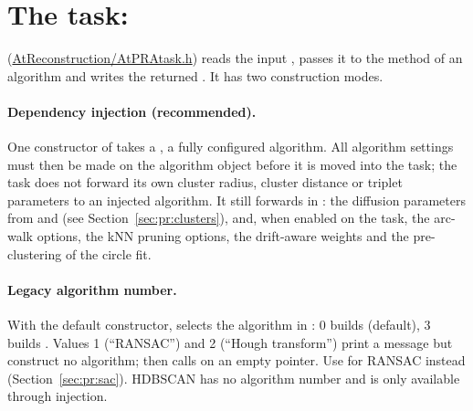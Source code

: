 \section{The task: }
\label{sec:pr:task}

 (\url{AtReconstruction/AtPRAtask.h}) reads the input , passes it to the
 method of an  algorithm and writes the returned . It has two
construction modes.

\paragraph{Dependency injection (recommended).} One constructor of  takes a
, a fully configured algorithm. All algorithm
settings must then be made on the algorithm object before it is moved into the task; the task does not
forward its own cluster radius, cluster distance or triplet parameters to an injected algorithm. It still
forwards in : the diffusion parameters from  and  (see
Section~\ref{sec:pr:clusters}), and, when enabled on the task, the arc-walk options, the kNN pruning
options, the drift-aware weights and the pre-clustering of the circle fit.

\paragraph{Legacy algorithm number.} With the default constructor,  selects the
algorithm in : 0 builds  (default), 3 builds
. Values 1 (``RANSAC'') and 2 (``Hough transform'') print a message but
construct no algorithm;  then calls  on an empty pointer. Use
 for RANSAC instead (Section~\ref{sec:pr:sac}). HDBSCAN has no algorithm
number and is only available through injection.

